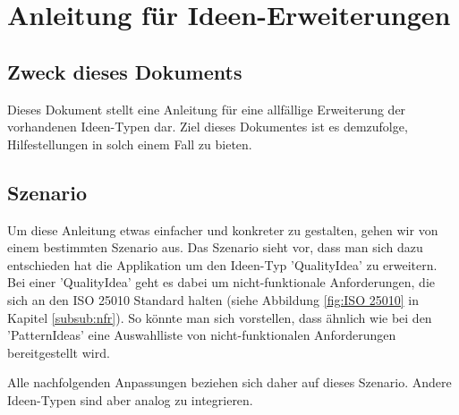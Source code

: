 \section{Anleitung für Ideen-Erweiterungen}
\label{sec:Ideen_Erweiterung}

\subsection{Zweck dieses Dokuments}
Dieses Dokument stellt eine Anleitung für eine allfällige Erweiterung der vorhandenen Ideen-Typen dar. Ziel dieses Dokumentes ist es demzufolge, Hilfestellungen in solch einem Fall zu bieten. 

\subsection{Szenario}
Um diese Anleitung etwas einfacher und konkreter zu gestalten, gehen wir von einem bestimmten Szenario aus. Das Szenario sieht vor, dass man sich dazu entschieden hat die Applikation um den Ideen-Typ 'QualityIdea' zu erweitern. Bei einer 'QualityIdea' geht es dabei um nicht-funktionale Anforderungen, die sich an den ISO 25010 Standard halten (siehe Abbildung \ref{fig:ISO 25010} in Kapitel \ref{subsub:nfr}). So könnte man sich vorstellen, dass ähnlich wie bei den 'PatternIdeas' eine Auswahlliste von nicht-funktionalen Anforderungen bereitgestellt wird. 

Alle nachfolgenden Anpassungen beziehen sich daher auf dieses Szenario. Andere Ideen-Typen sind aber analog zu integrieren.

